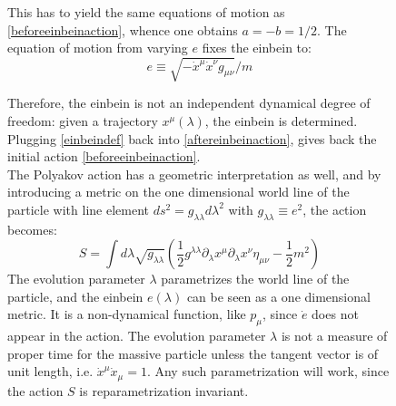 \documentclass[twoside,a4paper,11pt]{article}
\numberwithin{equation}{section}
\begin{document}
\begin{figure}[H]
  \centering
  \begin{minipage}[H]{0.59\textwidth}
    \justify


This has to yield the same equations of motion as \ref{beforeeinbeinaction}, whence one obtains $a = - b = 1/2$. The equation of motion from varying $e$ fixes the einbein to:
\begin{equation}
e \equiv \sqrt{-\dot{x}^\mu\dot{x}^\nu g_{\mu\nu}}/m
\label{einbeindef}
\end{equation}

Therefore, the einbein is not an independent dynamical degree of freedom: given a trajectory $x^\mu (\lambda)$, the einbein is determined. Plugging \ref{einbeindef} back into \ref{aftereinbeinaction}, gives back the initial action \ref{beforeeinbeinaction}. \\

The Polyakov action has a geometric interpretation as well, and by introducing a metric on the one dimensional world line of the particle with line element $ds^2 = g_{\lambda\lambda} d\lambda^2$ with $g_{\lambda\lambda} \equiv e^2$, the action becomes:
\begin{equation}
    S = \int d\lambda \sqrt{g_{\lambda\lambda}} \left( \frac{1}{2} g^{\lambda\lambda} \partial_\lambda x^\mu \partial_\lambda x^\nu \eta_{\mu\nu} - \frac{1}{2}m^2\right)
\end{equation}
The evolution parameter $\lambda$ parametrizes the world line of the particle, and the einbein $e(\lambda)$ can be seen as a one dimensional metric. It is a non-dynamical function, like $p_\mu$, since $\dot{e}$ does not appear in the action. The evolution parameter $\lambda$ is not a measure of proper time for the massive particle unless the tangent vector is of unit length, i.e. $\dot{x}^\mu \dot{x}_\mu =1$. Any such parametrization will work, since the action $S$ is reparametrization invariant.


\end{minipage}
\end{figure}
\end{document}
